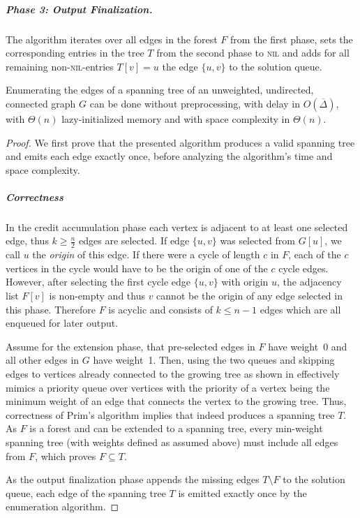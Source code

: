 \documentclass[a4paper, USenglish, cleveref, autoref, thm-restate]{lipics-v2021}
\newcommand{\avgdeg}{\overline{\Delta}}
\begin{document}
\subparagraph*{Phase 3: Output Finalization.}
The algorithm iterates over all edges in the forest $F$ from the first phase, sets the corresponding entries in the tree $T$ from the second phase to \textsc{nil} and adds for all remaining non-\textsc{nil}-entries $T[v] = u$ the edge $\{u,v\}$ to the solution queue.

\begin{theorem}
	\label{thm:uust-upper}
	Enumerating the edges of a spanning tree of an unweighted, undirected, connected graph $G$ can be done without preprocessing, with delay in $O(\avgdeg)$, with $\Theta(n)$ lazy-initialized memory and with space complexity in $\Theta(n)$.
\end{theorem}
\begin{proof}
	We first prove that the presented algorithm produces a valid spanning tree and emits each edge exactly once, before analyzing the algorithm's time and space complexity.

	\subparagraph*{Correctness}

	In the credit accumulation phase each vertex is adjacent to at least one selected edge, thus $k \geq \frac{n}{2}$ edges are selected.
	If edge $\{u,v\}$ was selected from $G[u]$, we call $u$ the \textit{origin} of this edge.
	If there were a cycle of length $c$ in $F$, each of the $c$ vertices in the cycle would have to be the origin of one of the $c$ cycle edges.
	However, after selecting the first cycle edge $\{u,v\}$ with origin $u$, the adjacency list $F[v]$ is non-empty and thus $v$ cannot be the origin of any edge selected in this phase.
	Therefore $F$ is acyclic and consists of $k \leq n-1$ edges which are all enqueued for later output.

	Assume for the extension phase, that pre-selected edges in $F$ have weight~0 and all other edges in $G$ have weight~1.
	Then, using the two queues and skipping edges to vertices already connected to the growing tree as shown in  effectively mimics a priority queue over vertices with the priority of a vertex being the minimum weight of an edge that connects the vertex to the growing tree.
	Thus, correctness of Prim's algorithm implies that  indeed produces a spanning tree $T$.
	As $F$ is a forest and can be extended to a spanning tree, every min-weight spanning tree (with weights defined as assumed above) must include all edges from $F$, which proves $F \subseteq T$.

	As the output finalization phase appends the missing edges $T \setminus F$ to the solution queue, each edge of the spanning tree $T$ is emitted exactly once by the enumeration algorithm.


\end{proof}
\end{document}
